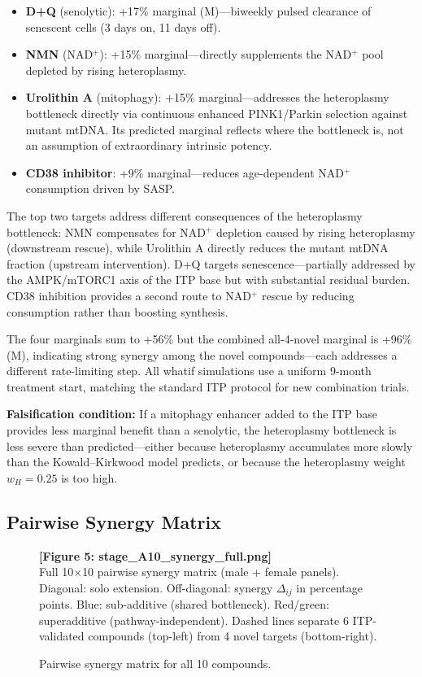 \documentclass[11pt]{article}
\begin{document}
\begin{itemize}
\item \textbf{D+Q} (senolytic): +17\% marginal (M)---biweekly pulsed clearance of senescent cells (3 days on, 11 days off).
\item \textbf{NMN} (NAD$^+$): +15\% marginal---directly supplements the NAD$^+$ pool depleted by rising heteroplasmy.
\item \textbf{Urolithin A} (mitophagy): +15\% marginal---addresses the heteroplasmy bottleneck directly via continuous enhanced PINK1/Parkin selection against mutant mtDNA. Its predicted marginal reflects where the bottleneck is, not an assumption of extraordinary intrinsic potency.
\item \textbf{CD38 inhibitor}: +9\% marginal---reduces age-dependent NAD$^+$ consumption driven by SASP.
\end{itemize}

The top two targets address different consequences of the heteroplasmy bottleneck: NMN compensates for NAD$^+$ depletion caused by rising heteroplasmy (downstream rescue), while Urolithin A directly reduces the mutant mtDNA fraction (upstream intervention). D+Q targets senescence---partially addressed by the AMPK/mTORC1 axis of the ITP base but with substantial residual burden. CD38 inhibition provides a second route to NAD$^+$ rescue by reducing consumption rather than boosting synthesis.

The four marginals sum to +56\% but the combined all-4-novel marginal is +96\% (M), indicating strong synergy among the novel compounds---each addresses a different rate-limiting step. All whatif simulations use a uniform 9-month treatment start, matching the standard ITP protocol for new combination trials.

\textbf{Falsification condition:} If a mitophagy enhancer added to the ITP base provides less marginal benefit than a senolytic, the heteroplasmy bottleneck is less severe than predicted---either because heteroplasmy accumulates more slowly than the Kowald--Kirkwood model predicts, or because the heteroplasmy weight $w_H = 0.25$ is too high.

\subsection{Pairwise Synergy Matrix}

\begin{figure}[ht]
\centering
\textbf{[Figure 5: stage\_A10\_synergy\_full.png]}\\[4pt]
\small Full 10$\times$10 pairwise synergy matrix (male + female panels). Diagonal: solo extension. Off-diagonal: synergy $\Delta_{ij}$ in percentage points. Blue: sub-additive (shared bottleneck). Red/green: superadditive (pathway-independent). Dashed lines separate 6 ITP-validated compounds (top-left) from 4 novel targets (bottom-right).
\caption{Pairwise synergy matrix for all 10 compounds.}
\label{fig:synergy}
\end{figure}
\end{document}
